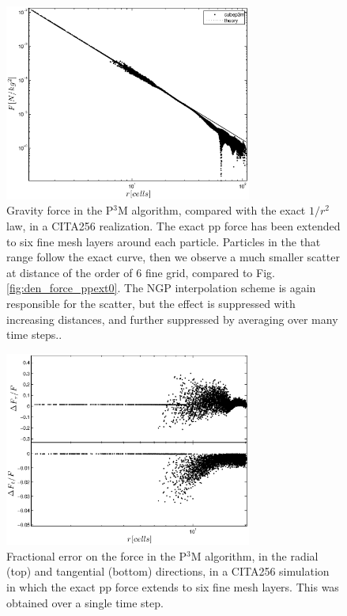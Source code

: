  \begin{figure}%
  \begin{center}
    \includegraphics[width=3.2in]{graphs/densityForce_ppext=6.eps}
  \caption{Gravity force in the P$^3$M algorithm, compared with the exact $1/r^{2}$ law,
  in a CITA256 realization. The exact pp force has been extended to six fine mesh layers around each particle.
  Particles in the that range follow the exact curve, then we observe a much smaller scatter at 
  distance of the order of 6 fine grid, compared to Fig. \ref{fig:den_force_ppext0}. 
  The NGP interpolation scheme is again responsible for the scatter, but the effect is suppressed with increasing distances, and further suppressed by averaging over many time steps.. 
    \label{fig:den_force_ppext6}}
\end{center}
\end{figure}


 
\begin{figure}%
  \begin{center}
    \includegraphics[width=3.2in]{graphs/densityForce_fracErr_ppext=6.eps}
  \caption{Fractional error on the force in the P$^3$M algorithm, in the radial (top) and tangential (bottom) directions,
  in a CITA256 simulation in which the exact pp force extends to six fine mesh layers. 
  This was obtained over a single time step.
    \label{fig:den_force_fracErr_ppext6}}
\end{center}
\end{figure}

